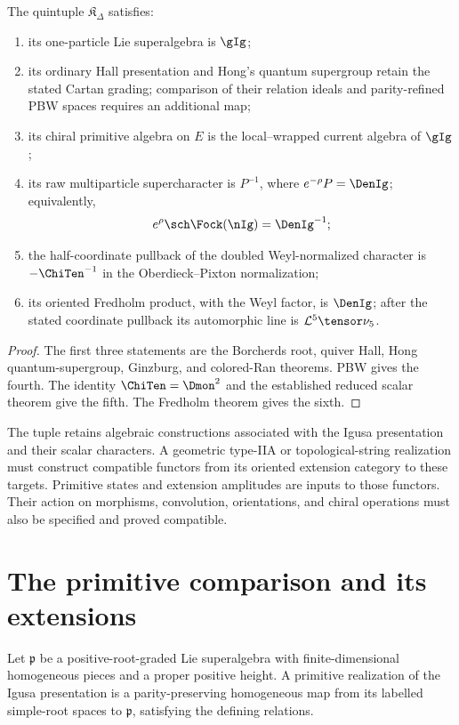 \begin{theorem}
The quintuple $\mathfrak K_\Delta$ satisfies:
\begin{enumerate}
\item its one-particle Lie superalgebra is $\gIg$;
\item its ordinary Hall presentation and Hong's quantum supergroup retain
the stated Cartan grading; comparison of their relation ideals and
parity-refined PBW spaces requires an additional map;
\item its chiral primitive algebra on $E$ is the local--wrapped current algebra of $\gIg$;
\item its raw multiparticle supercharacter is $P^{-1}$,
where $e^{-\rho}P=\DenIg$; equivalently,
\[
                 e^{\rho}\sch\Fock(\nIg)=\DenIg^{-1};
\]
\item the half-coordinate pullback of the doubled Weyl-normalized character is $-\ChiTen^{-1}$ in the Oberdieck--Pixton normalization;
\item its oriented Fredholm product, with the Weyl factor,
is $\DenIg$; after the stated coordinate pullback its
automorphic line is $\mathcal L^5\tensor\nu_5$.
\end{enumerate}
\end{theorem}
\begin{proof}
The first three statements are the Borcherds root, quiver Hall, Hong quantum-supergroup, Ginzburg, and colored-Ran theorems.  PBW gives the fourth.  The identity $\ChiTen=\Dmon^2$ and the established reduced scalar theorem give the fifth.  The Fredholm theorem gives the sixth.
\end{proof}

The tuple retains algebraic constructions associated with the Igusa
presentation and their scalar characters. A geometric type-IIA or
topological-string realization must construct compatible functors
from its oriented extension category to these targets. Primitive
states and extension amplitudes are inputs to those functors.
Their action on morphisms, convolution, orientations, and chiral
operations must also be specified and proved compatible.

\chapter{The primitive comparison and its extensions}
Let \(\mathfrak p\) be a positive-root-graded Lie superalgebra
with finite-dimensional homogeneous pieces and a proper positive
height. A primitive realization of the Igusa presentation is a
parity-preserving homogeneous map from its labelled simple-root
spaces to \(\mathfrak p\), satisfying the defining relations.


